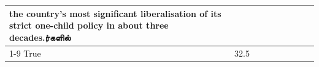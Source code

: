 \begin{table}[H]
\begin{tabular}{lllrlllll}
the country's most significant liberalisation of its strict one-child policy in about three decades.ர்களில் \\
\cline{1-9}
True & 32.5%
\end{tabular}
\end{table}
